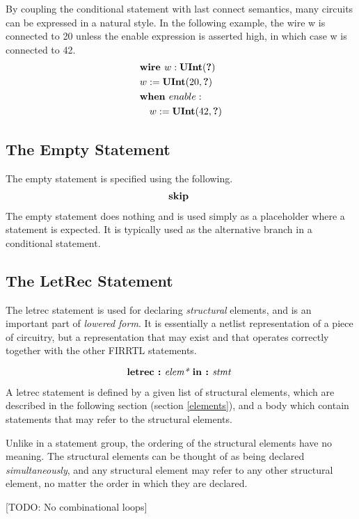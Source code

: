 \documentclass[12pt]{article}
\begin{document}
By coupling the conditional statement with last connect semantics, many circuits can be expressed in a natural style.
In the following example, the wire w is connected to 20 unless the enable expression is asserted high, in which case w is connected to 42. 
\[
\begin{aligned}
&\text{\bf wire\ } w : \text{\bf UInt}(\text{\bf ?}) \\
&w := \text{\bf UInt}(20, \text{\bf ?}) \\
&\text{\bf when\ } enable : \\
&\quad w := \text{\bf UInt}(42, \text{\bf ?}) \\
\end{aligned}
\]

\subsection{The Empty Statement}
The empty statement is specified using the following.
\[
\begin{aligned}
\text{\bf skip\ }
\end{aligned}
\]
The empty statement does nothing and is used simply as a placeholder where a statement is expected.
It is typically used as the alternative branch in a conditional statement. 

\subsection{The LetRec Statement}
The letrec statement is used for declaring {\em structural} elements, and is an important part of {\em lowered form}.
It is essentially a netlist representation of a piece of circuitry, but a representation that may exist and that operates correctly together with the other FIRRTL statements. 

\[
\text{\bf letrec :\ } \text{\em elem*\ } \text{\bf in :\ } \text{\em stmt\ }                           
\]

A letrec statement is defined by a given list of structural elements, which are described in the following section (section \ref{elements}), and a body which contain statements that may refer to the structural elements.

Unlike in a statement group, the ordering of the structural elements have no meaning.
The structural elements can be thought of as being declared {\em simultaneously}, and any structural element may refer to any other structural element, no matter the order in which they are declared. 

[TODO: No combinational loops]
\end{document}
